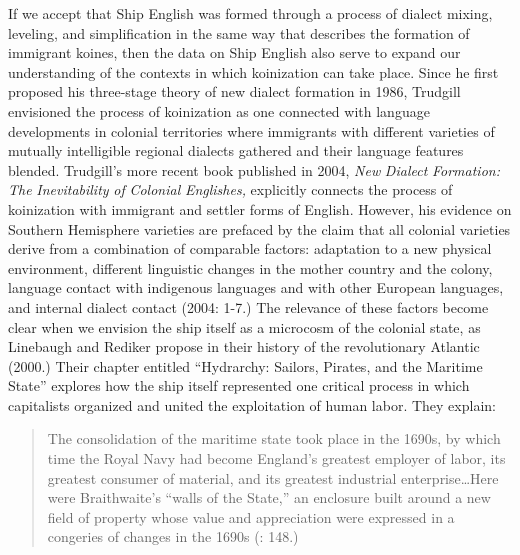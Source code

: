   If we accept that Ship English was formed through a process of dialect mixing, leveling, and simplification in the same way that \citet{Trudgill1986} describes the formation of immigrant koines, then the data on Ship English also serve to expand our understanding of the contexts in which koinization can take place. Since he first proposed his three-stage theory of new dialect formation in 1986, Trudgill envisioned the process of koinization as one connected with language developments in colonial territories where immigrants with different varieties of mutually intelligible regional dialects gathered and their language features blended. Trudgill’s more recent book published in 2004, \textit{New} \textit{Dialect} \textit{Formation:} \textit{The} \textit{Inevitability} \textit{of} \textit{Colonial} \textit{Englishes,} explicitly connects the process of koinization with immigrant and settler forms of English. However, his evidence on Southern Hemisphere varieties are prefaced by the claim that all colonial varieties derive from a combination of comparable factors: adaptation to a new physical environment, different linguistic changes in the mother country and the colony, language contact with indigenous languages and with other European languages, and internal dialect contact (2004: 1-7.) The relevance of these factors become clear when we envision the ship itself as a microcosm of the colonial state, as Linebaugh and Rediker propose in their history of the revolutionary Atlantic (2000.) Their chapter entitled “Hydrarchy: Sailors, Pirates, and the Maritime State” explores how the ship itself represented one critical process in which capitalists organized and united the exploitation of human labor. They explain:

\begin{quotation}
The consolidation of the maritime state took place in the 1690s, by which time the Royal Navy had become England’s greatest employer of labor, its greatest consumer of material, and its greatest industrial enterprise…Here were Braithwaite’s “walls of the State,” an enclosure built around a new field of property whose value and appreciation were expressed in a congeries of changes in the 1690s (\citealt{LinebaughRediker2004}: 148.)\end{quotation}

